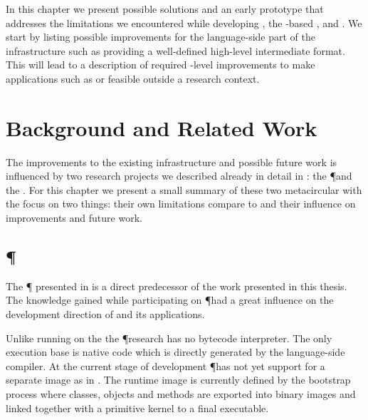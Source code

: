 In this chapter we present possible solutions and an early prototype \VM that addresses the limitations we encountered while developing \NB, the \B-based \FFI, \WF and \NBJ.
We start by listing possible improvements for the language-side part of the \B infrastructure such as providing a well-defined high-level intermediate format.
This will lead to a description of required \VM-level improvements to make applications such as \WF or \NBJ feasible outside a research context.

\section{Background and Related Work}
The improvements to the existing infrastructure \B and possible future work is influenced by two research projects we described already in detail in : the \P \VM and the \Klein \VM.
For this chapter we present a small summary of these two metacircular \VMs with the focus on two things: their own limitations compare to \B and their influence on improvements and future work.


\subsection{\P \VM}

The \P \VM \cite{Verw11a} presented in  is a direct predecessor of the work presented in this thesis.
The knowledge gained while participating on \P had a great influence on the development direction of \B and its applications.

Unlike \PH running on the \Cog \VM the \P research \VM has no bytecode interpreter.
The only execution base is native code which is directly generated by the language-side compiler.
At the current stage of development \P has not yet support for a separate image as in \PH.
The runtime image is currently defined by the bootstrap process where classes, objects and methods are exported into binary images and linked together with a primitive kernel to a final executable.

